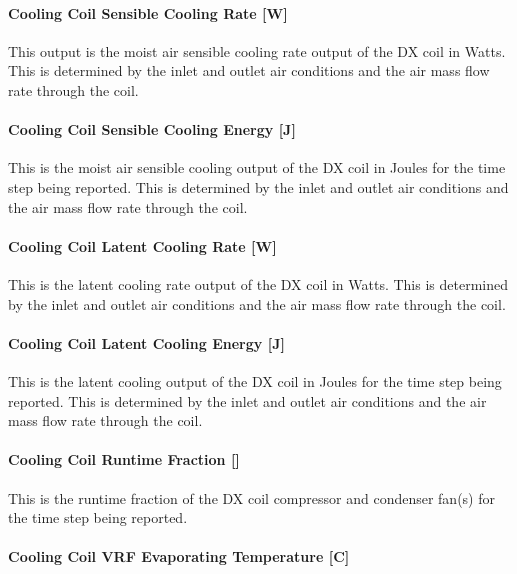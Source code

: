 \paragraph{Cooling Coil Sensible Cooling Rate {[}W{]}}\label{cooling-coil-sensible-cooling-rate-w-2}

This output is the moist air sensible cooling rate output of the DX coil in Watts. This is determined by the inlet and outlet air conditions and the air mass flow rate through the coil.

\paragraph{Cooling Coil Sensible Cooling Energy {[}J{]}}\label{cooling-coil-sensible-cooling-energy-j-2}

This is the moist air sensible cooling output of the DX coil in Joules for the time step being reported. This is determined by the inlet and outlet air conditions and the air mass flow rate through the coil.

\paragraph{Cooling Coil Latent Cooling Rate {[}W{]}}\label{cooling-coil-latent-cooling-rate-w-1}

This is the latent cooling rate output of the DX coil in Watts. This is determined by the inlet and outlet air conditions and the air mass flow rate through the coil.

\paragraph{Cooling Coil Latent Cooling Energy {[}J{]}}\label{cooling-coil-latent-cooling-energy-j-1}

This is the latent cooling output of the DX coil in Joules for the time step being reported. This is determined by the inlet and outlet air conditions and the air mass flow rate through the coil.

\paragraph{Cooling Coil Runtime Fraction {[]}}\label{cooling-coil-runtime-fraction-1}

This is the runtime fraction of the DX coil compressor and condenser fan(s) for the time step being reported.

\paragraph{Cooling Coil VRF Evaporating Temperature {[}C{]}}\label{cooling-coil-vrf-evaporating-temperature-c}


